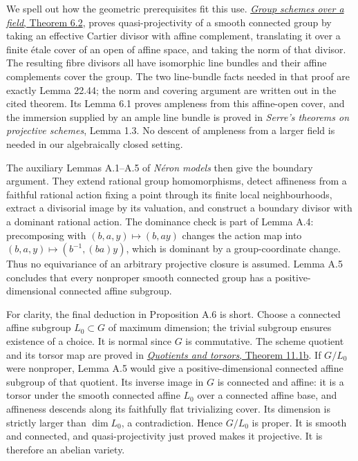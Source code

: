\documentclass[
  11pt,
  a4paper,
]{article}
\begin{document}
We spell out how the geometric prerequisites fit this use.
\href{https://kokunoyumeto.github.io/open-math-courses-public/courses/AG-GS/AG-GS-03.html\#6-why-every-algebraic-group-scheme-is-quasi-projective}{\emph{Group
schemes over a field}, Theorem 6.2}, proves quasi-projectivity of a
smooth connected group by taking an effective Cartier divisor with
affine complement, translating it over a finite étale cover of an open
of affine space, and taking the norm of that divisor. The resulting
fibre divisors all have isomorphic line bundles and their affine
complements cover the group. The two line-bundle facts needed in that
proof are exactly Lemma 22.44; the norm and covering argument are
written out in the cited theorem. Its Lemma 6.1 proves ampleness from
this affine-open cover, and the immersion supplied by an ample line
bundle is proved in \emph{Serre's theorems on projective schemes}, Lemma
1.3. No descent of ampleness from a larger field is needed in our
algebraically closed setting.

The auxiliary Lemmas A.1--A.5 of \emph{Néron models} then give the
boundary argument. They extend rational group homomorphisms, detect
affineness from a faithful rational action fixing a point through its
finite local neighbourhoods, extract a divisorial image by its
valuation, and construct a boundary divisor with a dominant rational
action. The dominance check is part of Lemma A.4: precomposing with
\((b,a,y)\mapsto(b,ay)\) changes the action map into
\((b,a,y)\mapsto(b^{-1},(ba)y)\), which is dominant by a
group-coordinate change. Thus no equivariance of an arbitrary projective
closure is assumed. Lemma A.5 concludes that every nonproper smooth
connected group has a positive-dimensional connected affine subgroup.

For clarity, the final deduction in Proposition A.6 is short. Choose a
connected affine subgroup \(L_0\subset G\) of maximum dimension; the
trivial subgroup ensures existence of a choice. It is normal since \(G\)
is commutative. The scheme quotient and its torsor map are proved in
\href{https://kokunoyumeto.github.io/open-math-courses-public/courses/AG-GS/AG-GS-04.html\#11-categorical-and-geometric-quotients}{\emph{Quotients
and torsors}, Theorem 11.1b}. If \(G/L_0\) were nonproper, Lemma A.5
would give a positive-dimensional connected affine subgroup of that
quotient. Its inverse image in \(G\) is connected and affine: it is a
torsor under the smooth connected affine \(L_0\) over a connected affine
base, and affineness descends along its faithfully flat trivializing
cover. Its dimension is strictly larger than \(\dim L_0\), a
contradiction. Hence \(G/L_0\) is proper. It is smooth and connected,
and quasi-projectivity just proved makes it projective. It is therefore
an abelian variety.
\end{document}
